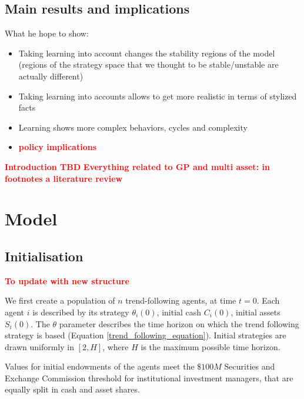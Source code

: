 \documentclass{article}
\newcommand\boldred[1]{\textcolor{red}{\textbf{#1}}}
\begin{document}
\subsection{Main results and implications}
What he hope to show:
\begin{itemize}
    \item Taking learning into account changes the stability regions of the model (regions of the strategy space that we thought to be stable/unstable are actually different)
    \item Taking learning into accounts allows to get more realistic in terms of stylized facts
    \item Learning shows more complex behaviors, cycles and complexity
    \item \boldred{policy implications}
\end{itemize}

\boldred{Introduction TBD}
\boldred{Everything related to GP and multi asset: in footnotes}
\boldred{a literature review}





\section{Model}

\subsection{Initialisation}
\boldred{To update with new structure}

We first create a population of $n$ trend-following agents, at time $t=0$. Each agent $i$ is described by its strategy $\theta_i(0)$, initial cash $C_i(0)$, initial assets $S_i(0)$. The $\theta$ parameter describes the time horizon on which the trend following strategy is based (Equation \ref{trend_following_equation}). Initial strategies are drawn uniformly in $[2,H]$, where $H$ is the maximum possible time horizon. \par
Values for initial endowments of the agents meet the $\$100M$ Securities and Exchange Commission threshold for institutional investment managers, that are equally split in cash and asset shares. 
\end{document}

